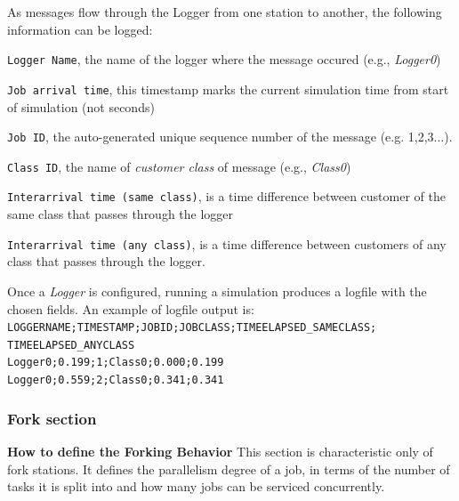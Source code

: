 \begin{enumerate*}
As messages flow through the Logger from one station to another,
the following information can be logged:
\begin{itemize*} \item \texttt{Logger Name}, the name of the logger
where the message occured (e.g., \emph{Logger0}) \item \texttt{Job
arrival time}, this timestamp marks the current simulation time
from start of simulation (not seconds) \item \texttt{Job ID}, the
auto-generated unique sequence number of the message (e.g.
1,2,3...). \item \texttt{Class ID}, the name of \emph{customer
class} of message (e.g., \emph{Class0}) \item \texttt{Interarrival
time (same class)}, is a time difference between customer of the
same class that passes through the logger \item
\texttt{Interarrival time (any class)}, is a time difference
between customers of any class that passes through the logger.
\end{itemize*}

Once a \emph{Logger} is configured, running a simulation produces
a logfile with the chosen fields. An example
of logfile output is:\\
\texttt{LOGGERNAME;TIMESTAMP;JOBID;JOBCLASS;TIMEELAPSED\_SAMECLASS;
TIMEELAPSED\_ANYCLASS\\ Logger0;0.199;1;Class0;0.000;0.199\\
Logger0;0.559;2;Class0;0.341;0.341}\\
\end{enumerate*}

\subsubsection{Fork section}
\label{sec:ForkSection} \textbf{How to define the Forking
Behavior} This section is characteristic only of fork stations. It
defines the parallelism degree of a job, in terms of the number of
tasks it is split into and how many jobs can be serviced
concurrently.

